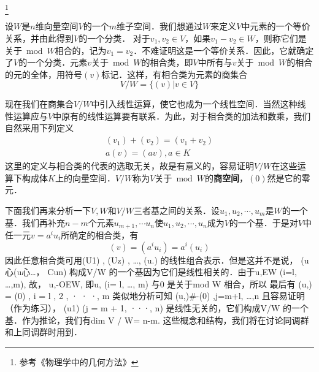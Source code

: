

\footnote{参考《物理学中的几何方法》}

设$W$是$n$维向量空间$V$的一个$m$维子空间．我们想通过$W$来定义$V$中元素的一个等价关系，并由此得到$V$的一个分类．
对于$v_1,v_2\in V$，如果$v_1-v_2\in W$，则称它们是关于$\bmod W $相合的，记为$v_1=v_2$．不难证明这是一个等价关系．因此，它就确定了$V $的一个分类．元素$v $关于$\bmod W $的相合类，即$V $中所有与$v $关于$\bmod W $的相合的元的全体，用符号$(v) $标记．这样，有相合类为元素的商集合
\begin{equation}
V / W=\{(v) | v \in V\}
\end{equation}

现在我们在商集合$V/W $中引入线性运算，使它也成为一个线性空间．当然这种线性运算应与$V $中原有的线性运算要有联系．为此，对于相合类的加法和数乘，我们自然采用下列定义
\begin{equation}
\begin{array}{l}\left(v_{1}\right)+\left(v_{2}\right)=\left(v_{1}+v_{2}\right) \\ a(v)=(a v), a \in K\end{array}
\end{equation}
这里的定义与相合类的代表的选取无关，故是有意义的，容易证明$V/W $在这些运算下构成体$K $上的向量空间．$V/W $称为$V $关于$\bmod W$的\textbf{商空间}，$(0)$然是它的零元．

下面我们再来分析一下$V,W$和$V/W $三者基之间的关系．设$u_1,u_2,\cdots,u_m$是$W $的一个基．我们再补充$n- m$个元素${u}_{m+1}, \cdots {u}_{n}$使$u_{1}, u_{2}, \cdots, u_{n}$成为$V$的一个基．于是对$V $中任一元$v=a^iu_i$所确定的相合类，有
\begin{equation}
(v)=\left(a^{i} u_{i}\right)=a^{i}\left(u_{i}\right)
\end{equation}
因此任意相合类可用(U1) , (Uz) , …, (u.) 的线性组合表示．但是这并不是说，
(u心(u心…， Cun) 构成V/W 的一个基因为它们是线性相关的．由于u,EW
(i=l, …,m), 故， u,-OEW, 即u, (i= l, …, m) 与0 是关于mod W 相合，所以
最后有
(u,) = (0) , i = l , 2 , · · ·, m
类似地分析可知
(u,)#-(0) ,j=m+l, …,n
且容易证明（作为练习）， (u1) (j = m + 1, ···, n) 是线性无关的，它们构成V/W
的一个基．作为推论，我们有dim V / W= n-m.
这些概念和结构，我们将在讨论同调群和上同调群时用到．